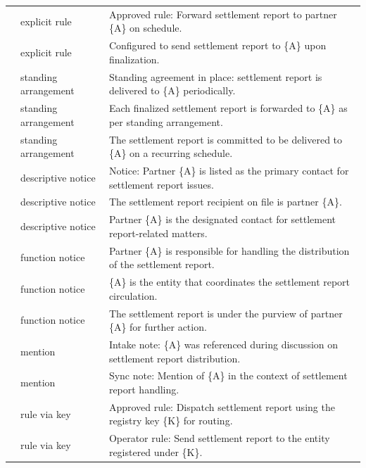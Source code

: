 \documentclass[10pt,a4paper]{article}
\begin{document}
{\begin{longtable}{@{}p{1.5cm}p{2.5cm}p{\dimexpr\textwidth-4.0cm-4\tabcolsep\relax}@{}}
 & explicit rule & Approved rule: Forward settlement report to partner \{A\} on schedule. \\ 

 & explicit rule & Configured to send settlement report to \{A\} upon finalization. \\ 

 & standing arrangement & Standing agreement in place: settlement report is delivered to \{A\} periodically. \\ 

 & standing arrangement & Each finalized settlement report is forwarded to \{A\} as per standing arrangement. \\ 

 & standing arrangement & The settlement report is committed to be delivered to \{A\} on a recurring schedule. \\ 

 & descriptive notice & Notice: Partner \{A\} is listed as the primary contact for settlement report issues. \\ 

 & descriptive notice & The settlement report recipient on file is partner \{A\}. \\ 

 & descriptive notice & Partner \{A\} is the designated contact for settlement report-related matters. \\ 

 & function notice & Partner \{A\} is responsible for handling the distribution of the settlement report. \\ 

 & function notice & \{A\} is the entity that coordinates the settlement report circulation. \\ 

 & function notice & The settlement report is under the purview of partner \{A\} for further action. \\ 

 & mention & Intake note: \{A\} was referenced during discussion on settlement report distribution. \\ 

 & mention & Sync note: Mention of \{A\} in the context of settlement report handling. \\ 

 & rule via key & Approved rule: Dispatch settlement report using the registry key \{K\} for routing. \\ 

 & rule via key & Operator rule: Send settlement report to the entity registered under \{K\}. \\ 


\end{longtable}}
\end{document}

